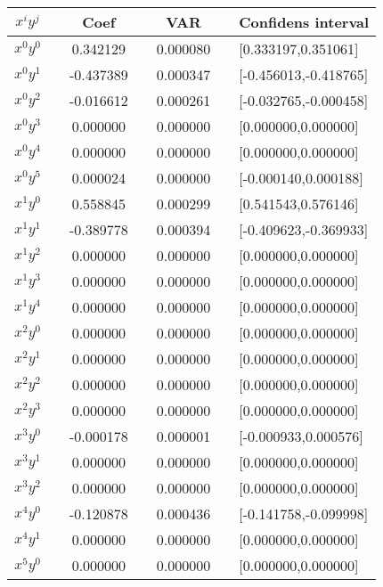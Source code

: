 \begin{center}
\label{tab:lasso-var-conf}
\begin{tabularx}{\textwidth}{c X c X c X l}
    \hline
    \hline
        $x^iy^j$ && Coef && VAR && Confidens interval\\
    \hline
        $x^0y^0$ && 0.342129   && 0.000080   && [0.333197,0.351061] \\
        $x^0y^1$ && -0.437389  && 0.000347   && [-0.456013,-0.418765] \\
        $x^0y^2$ && -0.016612  && 0.000261   && [-0.032765,-0.000458] \\
        $x^0y^3$ && 0.000000   && 0.000000   && [0.000000,0.000000] \\
        $x^0y^4$ && 0.000000   && 0.000000   && [0.000000,0.000000] \\
        $x^0y^5$ && 0.000024   && 0.000000   && [-0.000140,0.000188] \\
        $x^1y^0$ && 0.558845   && 0.000299   && [0.541543,0.576146] \\
        $x^1y^1$ && -0.389778  && 0.000394   && [-0.409623,-0.369933] \\
        $x^1y^2$ && 0.000000   && 0.000000   && [0.000000,0.000000] \\
        $x^1y^3$ && 0.000000   && 0.000000   && [0.000000,0.000000] \\
        $x^1y^4$ && 0.000000   && 0.000000   && [0.000000,0.000000] \\
        $x^2y^0$ && 0.000000   && 0.000000   && [0.000000,0.000000] \\
        $x^2y^1$ && 0.000000   && 0.000000   && [0.000000,0.000000] \\
        $x^2y^2$ && 0.000000   && 0.000000   && [0.000000,0.000000] \\
        $x^2y^3$ && 0.000000   && 0.000000   && [0.000000,0.000000] \\
        $x^3y^0$ && -0.000178  && 0.000001   && [-0.000933,0.000576] \\
        $x^3y^1$ && 0.000000   && 0.000000   && [0.000000,0.000000] \\
        $x^3y^2$ && 0.000000   && 0.000000   && [0.000000,0.000000] \\
        $x^4y^0$ && -0.120878  && 0.000436   && [-0.141758,-0.099998] \\
        $x^4y^1$ && 0.000000   && 0.000000   && [0.000000,0.000000] \\
        $x^5y^0$ && 0.000000   && 0.000000   && [0.000000,0.000000] \\
    \hline
\end{tabularx}
\end{center}

